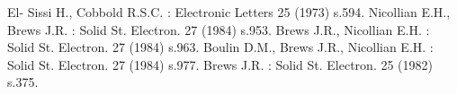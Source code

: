 
\begin{thebibliography}{}
 El- Sissi H., Cobbold R.S.C. : Electronic Letters 25
  (1973) s.594.
 Nicollian E.H., Brews J.R. : Solid St.  Electron. 27
  (1984) s.953.
 Brews J.R., Nicollian E.H. : Solid St.  Electron. 27
  (1984) s.963.
 Boulin D.M., Brews J.R., Nicollian E.H.  : Solid St.
  Electron. 27 (1984) s.977.
  Brews J.R. : Solid St. Electron. 25 (1982) s.375.
\end{thebibliography}
